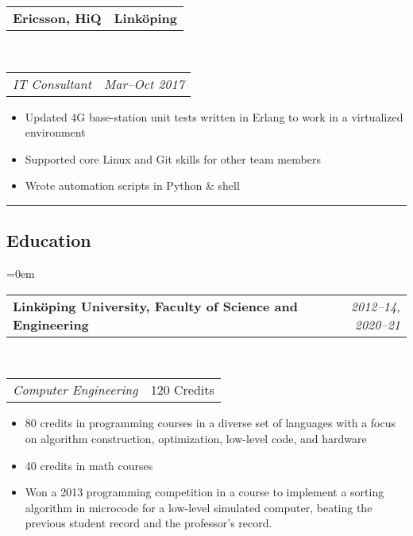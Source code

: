 \documentclass[10pt,letterpaper]{article}
\makeatletter
\newcommand{\headerrow}[2]
{\begin{tabular*}{\linewidth}{l@{\extracolsep{\fill}}r}
    #1 &
    #2 \\
\end{tabular*}}
\makeatother
\begin{document}
\headerrow
{\textbf{Ericsson, HiQ}}
{\textbf{Linköping}}
\\
\headerrow
{\emph{IT Consultant}}
{\emph{Mar--Oct 2017}}
\begin{itemize}[noitemsep, topsep=0pt]
    \item Updated 4G base-station unit tests written in
        Erlang to work in a virtualized environment
    \item Supported core Linux and Git skills for other team members
    \item Wrote automation scripts in Python \& shell
\end{itemize}
\vspace{0.5em}



\hrule
\vspace{-0.4em}
\subsection*{Education}
\parindent=0em

\headerrow
    {\textbf{Linköping University, Faculty of Science and Engineering}}
    {\emph{2012--14, 2020--21}}
\\
\headerrow
    {\emph{Computer Engineering}}
    {120 Credits}
\begin{itemize}[noitemsep, topsep=0pt]
    \item 80 credits in programming courses in a diverse set of languages with
        a focus on algorithm construction, optimization, low-level code, and
        hardware
    \item 40 credits in math courses
    \item Won a 2013 programming competition in a course to implement a sorting
        algorithm in microcode for a low-level simulated computer, beating the
        previous student record and the professor's record.
\end{itemize}
\vspace{0.5em}
\end{document}
